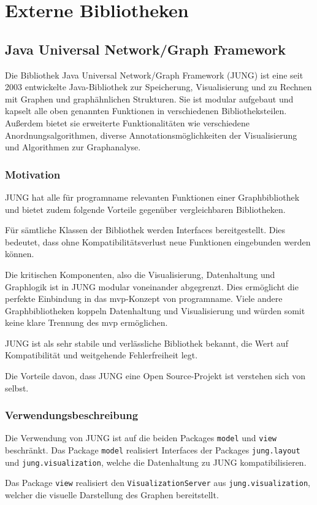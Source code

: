 \section{Externe Bibliotheken}
\subsection{Java Universal Network/Graph Framework}
Die Bibliothek Java Universal Network/Graph Framework (JUNG) ist eine seit 2003 entwickelte Java-Bibliothek zur Speicherung, Visualisierung und zu Rechnen mit Graphen und graphähnlichen Strukturen. Sie ist modular aufgebaut und kapselt alle oben genannten Funktionen in verschiedenen Bibliotheksteilen. Außerdem bietet sie erweiterte Funktionalitäten wie verschiedene Anordnungsalgorithmen, diverse Annotationsmöglichkeiten der Visualisierung und Algorithmen zur Graphanalyse.
\subsubsection{Motivation}
JUNG hat alle für \gls{programname} relevanten Funktionen einer Graphbibliothek und bietet zudem folgende Vorteile gegenüber vergleichbaren Bibliotheken.

Für sämtliche Klassen der Bibliothek werden Interfaces bereitgestellt. Dies bedeutet, dass ohne Kompatibilitätsverlust neue Funktionen eingebunden werden können.

Die kritischen Komponenten, also die Visualisierung, Datenhaltung und Graphlogik ist in JUNG modular voneinander abgegrenzt. Dies ermöglicht die perfekte Einbindung in das \gls{mvp}-Konzept von \gls{programname}. Viele andere Graphbibliotheken koppeln Datenhaltung und Visualisierung und würden somit keine klare Trennung des \gls{mvp} ermöglichen.

JUNG ist als sehr stabile und verlässliche Bibliothek bekannt, die Wert auf Kompatibilität und weitgehende Fehlerfreiheit legt.

Die Vorteile davon, dass JUNG eine Open Source-Projekt ist verstehen sich von selbst.

\subsubsection{Verwendungsbeschreibung}

Die Verwendung von JUNG ist auf die beiden Packages \texttt{model} und  \texttt{view} beschränkt. Das Package \texttt{model} realisiert Interfaces der Packages \texttt{jung.layout} und \texttt{jung.visualization}, welche die Datenhaltung zu JUNG kompatibilisieren.

Das Package \texttt{view} realisiert den \texttt{VisualizationServer} aus \texttt{jung.visualization}, welcher die visuelle Darstellung des Graphen bereitstellt.
